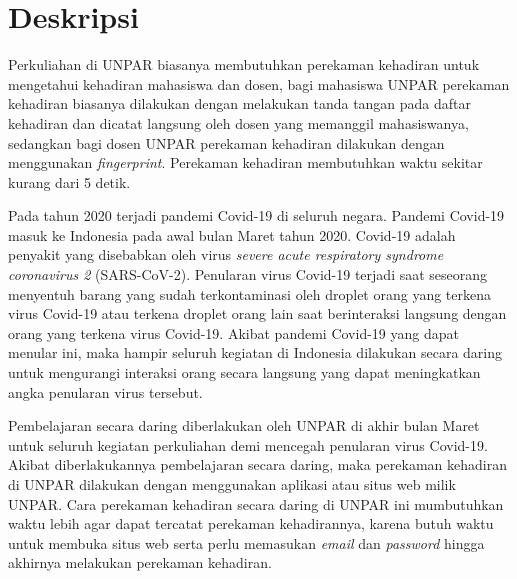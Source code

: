 \documentclass[a4paper,twoside]{article}
\begin{document}
\title{\@judultopik}
\author{\nama \textendash \@npm} 

\newcommand{\nama}{Reinalta Sugianto}
\newcommand{\@npm}{2017730035}
\newcommand{\@judultopik}{Perekaman Kehadiran Daring Otomatis} %
\newcommand{\jumpemb}{1} %
\newcommand{\tanggal}{04/10/2021}


\maketitle


\section{Deskripsi}
Perkuliahan di UNPAR biasanya membutuhkan perekaman kehadiran untuk mengetahui kehadiran mahasiswa dan dosen, bagi mahasiswa UNPAR perekaman kehadiran biasanya dilakukan dengan melakukan tanda tangan pada daftar kehadiran dan dicatat langsung oleh dosen yang memanggil mahasiswanya, sedangkan bagi dosen UNPAR perekaman kehadiran dilakukan dengan menggunakan  \textit{fingerprint}. Perekaman kehadiran membutuhkan waktu sekitar kurang dari 5 detik.

Pada tahun 2020 terjadi pandemi Covid-19 di seluruh negara. Pandemi Covid-19 masuk ke Indonesia pada awal bulan Maret tahun 2020. Covid-19 adalah penyakit yang disebabkan oleh virus \textit{severe acute respiratory syndrome coronavirus 2} (SARS-CoV-2). Penularan virus Covid-19 terjadi saat seseorang menyentuh barang yang sudah terkontaminasi oleh droplet orang yang terkena virus Covid-19 atau terkena droplet orang lain saat berinteraksi langsung dengan orang yang terkena virus Covid-19.  Akibat pandemi Covid-19 yang dapat menular ini, maka hampir seluruh kegiatan di Indonesia dilakukan secara daring untuk mengurangi interaksi orang secara langsung yang dapat meningkatkan angka penularan virus tersebut. 

Pembelajaran secara daring diberlakukan oleh UNPAR di akhir bulan Maret untuk seluruh kegiatan perkuliahan demi mencegah penularan virus Covid-19. Akibat diberlakukannya pembelajaran secara daring, maka perekaman kehadiran di UNPAR dilakukan dengan menggunakan aplikasi atau situs web milik UNPAR. Cara perekaman kehadiran secara daring di UNPAR ini mumbutuhkan waktu lebih agar dapat tercatat perekaman kehadirannya, karena butuh waktu untuk membuka situs web serta perlu memasukan \textit{email} dan \textit{password} hingga akhirnya melakukan perekaman kehadiran. 
\end{document}

